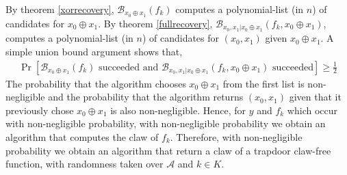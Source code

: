 \documentclass{article}
\begin{document}
By theorem \ref{xorrecovery}, $\mathcal{B}_{x_{0}\oplus x_{1}}(f_{k})$ computes a polynomial-list (in $n$) of candidates for $x_{0}\oplus x_{1}$. By theorem \ref{fullrecovery}, $\mathcal{B}_{x_{0}, x_{1}|x_{0}\oplus x_{1}}(f_{k}, x_{0}\oplus x_{1})$, computes a polynomial-list (in $n$) of candidates for $(x_{0}, x_{1})$ given $x_{0}\oplus x_{1}$. A simple union bound argument shows that, \begin{align}\Pr[\mathcal{B}_{x_{0}\oplus x_{1}}(f_{k})\text{ succeeded and }\mathcal{B}_{x_{0}, x_{1}|x_{0}\oplus x_{1}}(f_{k}, x_{0}\oplus x_{1})\text{ succeeded}] \geq \frac{1}{2}\end{align}  The probability that the algorithm chooses $x_{0}\oplus x_{1}$ from the first list is non-negligible and the probability that the algorithm returns $(x_{0}, x_{1})$ given that it previously chose $x_{0}\oplus x_{1}$ is also non-negligible. Hence, for $y$ and $f_{k}$ which occur with non-negligible probability, with non-negligible probability we obtain an algorithm that computes the claw of $f_{k}$. Therefore, with non-negligible probability we obtain an algorithm that return a claw of a trapdoor claw-free function, with randomness taken over $\mathcal{A}$ and $k\in K$.
\end{document}
